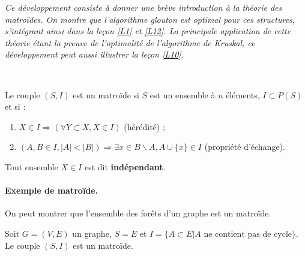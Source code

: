
\textit{Ce développement consiste à donner une brève introduction à la théorie des matroïdes. On montre que l'algorithme glouton est optimal pour ces structures, s'intégrant ainsi dans la leçon \ref{L1} et \ref{L12}. La principale application de cette théorie étant la preuve de l'optimalité de l'algorithme de Kruskal, ce développement peut aussi illustrer la leçon \ref{L10}.
}

\begin{definition}~

Le couple $(S,I)$ est un matroïde si $S$ est un ensemble à $n$ éléments, $I\subset P(S)$ et si :
\begin{enumerate}
\item $X\in I \Rightarrow (\forall Y \subset X, X\in I)$ (hérédité) ;
\item $(A,B\in I, |A| <|B|) \Rightarrow \exists x \in B\backslash A, A\cup\{x\} \in I$ (propriété d'échange).
\end{enumerate}
Tout ensemble $X\in I$ est dit \textbf{indépendant}.
\end{definition}

\paragraph{Exemple de matroïde.}On peut montrer que l'ensemble des forêts d'un graphe est un matroïde. 

\begin{theorem}
Soit $G=(V,E)$ un graphe, $S=E$ et $I=\{A\subset E | \text{$A$ ne contient pas de cycle} \}$. Le couple $(S,I)$ est un matroïde.
\end{theorem}

